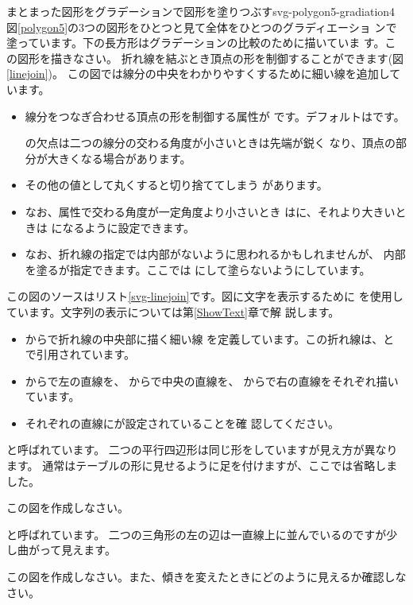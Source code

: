 {まとまった図形をグラデーションで図形を塗りつぶす}{svg-polygon5-gradiation4}
{図\ref{polygon5}の3つの図形をひとつと見て全体をひとつのグラディエーショ
ンで塗っています。下の長方形はグラデーションの比較のために描いていま
す。この図形を描きなさい。}
\newpage
折れ線を結ぶとき頂点の形を制御することができます(図\ref{linejoin})。
この図では線分の中央をわかりやすくするために細い線を追加しています。

\begin{itemize}
 \item 線分をつなぎ合わせる頂点の形を制御する属性が
       です。デフォルトはです。

の欠点は二つの線分の交わる角度が小さいときは先端が鋭く
       なり、頂点の部分が大きくなる場合があります。
 \item その他の値として丸くすると切り捨ててしまう
       があります。
 \item なお、属性で交わる角度が一定角度より小さいとき
       はに、それより大きいときは
       になるように設定できます。
 \item なお、折れ線の指定では内部がないように思われるかもしれませんが、
       内部を塗るが指定できます。ここでは
       にして塗らないようにしています。
\end{itemize}
この図のソースはリスト\ref{svg-linejoin}です。図に文字を表示するために
を使用しています。文字列の表示については第\ref{ShowText}章で解
説します。
\begin{itemize}
 \item {}からで折れ線の中央部に描く細い線
       を定義しています。この折れ線は、と
       で引用されています。
 \item {}からで左の直線を、
       からで中央の直線を、
       からで右の直線をそれぞれ描いています。
 \item それぞれの直線にが設定されていることを確
       認してください。
\end{itemize}

{と呼ばれています。
二つの平行四辺形は同じ形をしていますが見え方が異なります。
通常はテーブルの形に見せるように足を付けますが、ここでは省略しました。
\par
この図を作成しなさい。}

{と呼ばれています。
二つの三角形の左の辺は一直線上に並んでいるのですが少し曲がって見えます。
\par
この図を作成しなさい。また、傾きを変えたときにどのように見えるか確認しな
 さい。}
